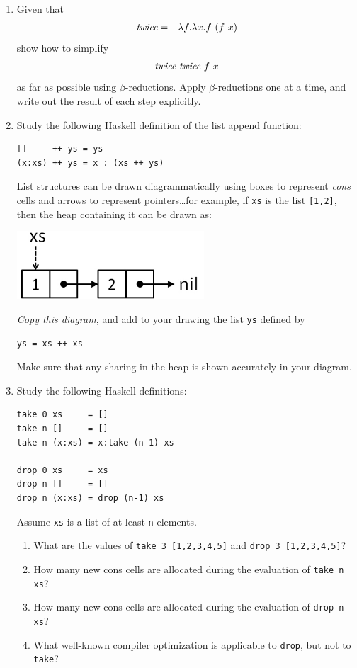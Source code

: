 \documentclass{article}
\begin{document}
\begin{enumerate}

\newcommand{\id}[1]{\mbox{\it #1}}

\item Given that
\begin{eqnarray*}
\id{twice} &=& \lambda f.\lambda x.f~(f~x)
\end{eqnarray*}
show how to simplify 
\[ \id{twice}~\id{twice}~f~x \]
as far as possible using $\beta$-reductions.  Apply $\beta$-reductions
one at a time, and write out the result of each step explicitly.

\item 
Study the following Haskell definition of the list append function:
\begin{verbatim}
[]     ++ ys = ys
(x:xs) ++ ys = x : (xs ++ ys)
\end{verbatim}
List structures can be drawn diagrammatically using boxes to represent
{\em cons} cells and arrows to represent pointers\dots for example, if
\verb!xs! is the list \verb![1,2]!, then the heap containing it can be drawn
as:
\begin{center}
\includegraphics[width=7cm]{List.jpg}
\end{center}
{\em Copy this diagram}, and add to your drawing the list \verb!ys! defined by
\begin{verbatim}
ys = xs ++ xs
\end{verbatim}
Make sure that any sharing in the heap is shown accurately in your diagram.

\item
Study the following Haskell definitions:
\begin{verbatim}
take 0 xs     = []
take n []     = []
take n (x:xs) = x:take (n-1) xs

drop 0 xs     = xs
drop n []     = []
drop n (x:xs) = drop (n-1) xs
\end{verbatim}

Assume \verb!xs! is a list of at least \verb!n! elements.
\begin{enumerate}
\item
What are the values of \verb!take 3 [1,2,3,4,5]! and \verb!drop 3 [1,2,3,4,5]!?
\item
How many new cons cells are allocated during the evaluation of \verb!take n xs!?
\item
How many new cons cells are allocated during the evaluation of \verb!drop n xs!?
\item
What well-known compiler optimization is applicable to \verb!drop!, but not to \verb!take!?
\end{enumerate}



\end{enumerate}
\end{document}
